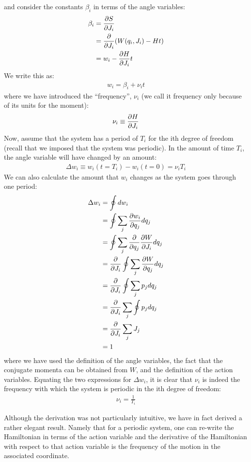and consider the constants $\beta_i$ in terms of the angle variables:
\begin{align}
\beta_i&=\frac{\partial S}{\partial J_i}\nonumber\\
&=\frac{\partial }{\partial J_i}(W(q_i, J_i)-Ht)\nonumber\\
&=w_i-\frac{\partial H}{\partial J_i}t
\end{align}
We write this as:
\begin{align}
w_i=\beta_i+\nu_it
\end{align}
where we have introduced the ``frequency'', $\nu_i$ (we call it frequency only because of its units for the moment):
\begin{align}
\nu_i\equiv\frac{\partial H}{\partial J_i}
\end{align}
Now, assume that the system has a period of $T_i$ for the ith degree of freedom (recall that we imposed that the system was periodic). In the amount of time $T_i$, the angle variable will have changed by an amount:
\begin{align}
\Delta w_i \equiv w_i(t=T_i)-w_i(t=0)=\nu_iT_i
\end{align}
We can also calculate the amount that $w_i$ changes as the system goes through one period:
\begin{align}
\Delta w_i &=\oint dw_i\nonumber\\
&=\oint \sum_j \frac{\partial w_i}{\partial q_j}dq_j \nonumber\\
&=\oint \sum_j \frac{\partial }{\partial q_j}\frac{\partial W}{\partial J_i}dq_j\nonumber\\
&=\frac{\partial }{\partial J_i}\oint  \sum_j \frac{\partial W}{\partial q_j}dq_j\nonumber\\
&=\frac{\partial }{\partial J_i}\oint  \sum_j p_jdq_j\nonumber\\
&=\frac{\partial }{\partial J_i}\sum_j\oint   p_jdq_j\nonumber\\
&=\frac{\partial }{\partial J_i}\sum_jJ_j\nonumber\\
&=1
\end{align}
where we have used the definition of the angle variables, the fact that the conjugate momenta can be obtained from $W$, and the definition of the action variables. Equating the two expressions for $\Delta w_i$, it is clear that $\nu_i$ is indeed the frequency with which the system is periodic in the ith degree of freedom:
\begin{align}
\nu_i=\frac{1}{T_i}
\end{align}

Although the derivation was not particularly intuitive, we have in fact derived a rather elegant result. Namely that for a periodic system, one can re-write the Hamiltonian in terms of the action variable and the derivative of the Hamiltonian with respect to that action variable is the frequency of the motion in the associated coordinate.

